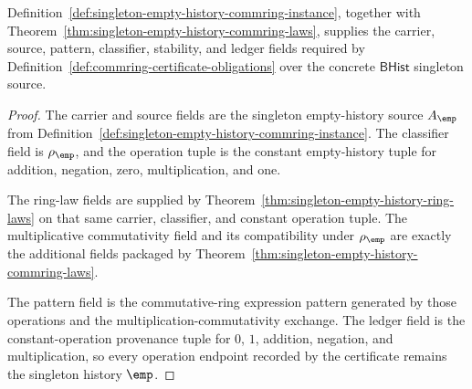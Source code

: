 \begin{theorem}
\label{thm:singleton-empty-history-commring-schema-certificate}
Definition~\ref{def:singleton-empty-history-commring-instance}, together with
Theorem~\ref{thm:singleton-empty-history-commring-laws}, supplies the carrier,
source, pattern, classifier, stability, and ledger fields required by
Definition~\ref{def:commring-certificate-obligations} over the concrete
$\mathsf{BHist}$ singleton source.
\end{theorem}
\begin{proof}
The carrier and source fields are the singleton empty-history source
$A_{\emp}$ from Definition~\ref{def:singleton-empty-history-commring-instance}.
The classifier field is $\rho_{\emp}$, and the operation tuple is the constant
empty-history tuple for addition, negation, zero, multiplication, and one.

The ring-law fields are supplied by
Theorem~\ref{thm:singleton-empty-history-ring-laws} on that same carrier,
classifier, and constant operation tuple. The multiplicative commutativity
field and its compatibility under $\rho_{\emp}$ are exactly the additional
fields packaged by Theorem~\ref{thm:singleton-empty-history-commring-laws}.

The pattern field is the commutative-ring expression pattern generated by those
operations and the multiplication-commutativity exchange. The ledger field is
the constant-operation provenance tuple for $0$, $1$, addition, negation, and
multiplication, so every operation endpoint recorded by the certificate remains
the singleton history $\emp$.
\end{proof}

